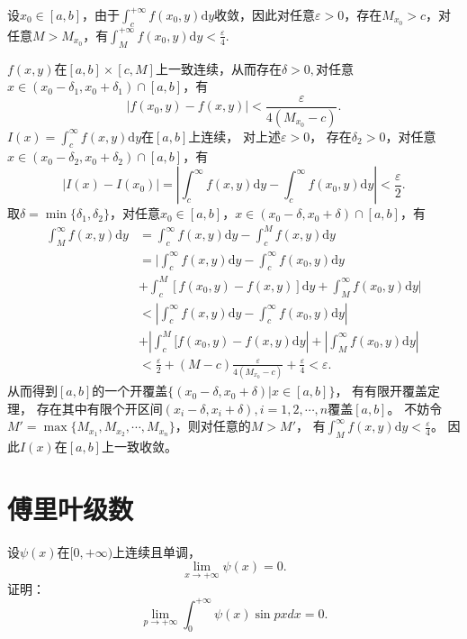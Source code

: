 \begin{solution}
  设$x_0\in[a,b]$，由于$\int_c^{+\infty}f(x_0,y)\mathrm{d}y$收敛，因此对任意$\varepsilon>0$，存在$M_{x_0}>c$，对任意$M>M_{x_0}$，有$\int_M^{+\infty}f(x_0,y)\mathrm{d}y<\frac{\varepsilon}{4}.$

$f(x,y)$在$[a,b]\times[c,M]$上一致连续，从而存在$\delta>0,$对任意$x\in(x_0-\delta_1,x_0+\delta_1)\cap[a,b]$，有$$|f(x_0,y)-f(x,y)|<\frac{\varepsilon}{4(M_{x_0}-c)}.$$
$I(x)=\int_c^{\infty}f(x,y)\mathrm{d}y$在$[a,b]$上连续，
对上述$\varepsilon>0$，
存在$\delta_2>0$，对任意$x\in(x_0-\delta_2,x_0+\delta_2)\cap[a,b]$，有
$$|I(x)-I(x_0)|=|\int_c^{\infty}f(x,y)\mathrm{d}y-\int_c^{\infty}f(x_0,y)\mathrm{d}y|<\frac{\varepsilon}{2}.$$
取$\delta=\min\{\delta_1,\delta_2\}$，对任意$x_0\in[a,b]$，$x\in(x_0-\delta,x_0+\delta)\cap[a,b]$，有
\begin{align*}
\int_M^{\infty}f(x,y)\mathrm{d}y&=\int_c^{\infty}f(x,y)\mathrm{d}y-\int_c^Mf(x,y)\mathrm{d}y\\
&=|\int_c^{\infty}f(x,y)\mathrm{d}y-\int_c^{\infty}f(x_0,y)\mathrm{d}y\\
&+\int_c^M[f(x_0,y)-f(x,y)]\mathrm{d}y+\int_M^{\infty}f(x_0,y)\mathrm{d}y|\\
&<|\int_c^{\infty}f(x,y)\mathrm{d}y-\int_c^{\infty}f(x_0,y)\mathrm{d}y|\\
&+|\int_c^M[f(x_0,y)-f(x,y)\mathrm{d}y|+|\int_M^{\infty}f(x_0,y)\mathrm{d}y|\\
&<\frac{\varepsilon}{2}+(M-c)\frac{\varepsilon}{4(M_{x_0}-c)}+\frac{\varepsilon}{4}<\varepsilon.
\end{align*}
从而得到$[a,b]$的一个开覆盖$\{(x_0-\delta,x_0+\delta)|x\in[a,b]\}$，
有有限开覆盖定理，
存在其中有限个开区间$(x_i-\delta,x_i+\delta),i=1,2,\cdots,n$覆盖$[a,b]$。
不妨令$M'=\max\{M_{x_1},M_{x_2},\cdots,M_{x_n}\}$，则对任意的$M>M'$，
有$\int_M^{\infty}f(x,y)\mathrm{d}y<\frac{\varepsilon}{4}$。
因此$I(x)$在$[a,b]$上一致收敛。
\end{solution}

\section{傅里叶级数}

\begin{exercise}
  设$\psi(x)$在$[0,+\infty)$上连续且单调，$$\displaystyle\lim_{x\rightarrow+\infty}\psi(x)=0.$$
  证明：$$\displaystyle\lim_{p\rightarrow+\infty}\int_0^{+\infty}\psi(x)\sin pxdx=0.$$  
\end{exercise}

